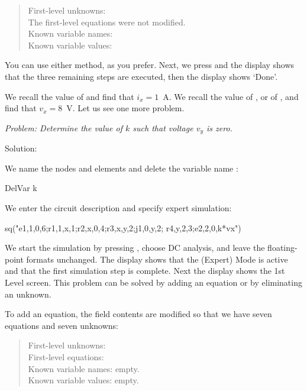 \begin{quote}
First-level unknowns: \\
The first-level equations were not modified.\\
Known variable names: \\
Known variable values: 
\end{quote}

You can use either method, as you prefer. Next, we press 
and the display shows that the three remaining steps are executed,
then the display shows `Done'.

We recall the value of  and find that $i_x = 1$~A. We
recall the value of , or of , and find that
$v_x = 8$~V. Let us see one more problem.


\emph{Problem: Determine the value of $k$ such that voltage $v_y$ is
zero.}

Solution:

We name the nodes and elements and delete the variable name
:

\begin{entry}
DelVar k
\end{entry}

We enter the circuit description and specify expert simulation:

\begin{entry}
sq\expert("e1,1,0,6;r1,1,x,1;r2,x,0,4;r3,x,y,2;j1,0,y,2;
          r4,y,2,3;e2,2,0,k*vx")
\end{entry}

We start the simulation by pressing , choose DC analysis,
and leave the floating-point formats unchanged. The display shows
that the (Expert) Mode is active and that the first simulation step
is complete. Next the display shows the 1st Level screen. This
problem can be solved by adding an equation or by eliminating an
unknown.

To add an equation, the field contents are modified so that we have
seven equations and seven unknowns:

\begin{quote}
First-level unknowns: \\
First-level equations: \\
Known variable names: empty.\\
Known variable values: empty.
\end{quote}

